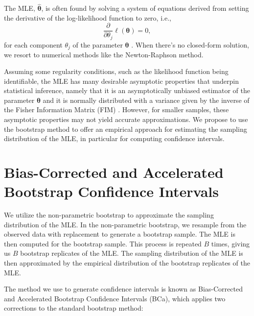 \documentclass[
]{article}
\begin{document}
The MLE, \(\hat{\boldsymbol{\theta}}\), is often found by solving a
system of equations derived from setting the derivative of the
log-likelihood function to zero, i.e., \begin{equation}
\label{eq:mle_eq}
\frac{\partial}{\partial \theta_j} \ell(\boldsymbol{\theta}) = 0,
\end{equation} for each component \(\theta_j\) of the parameter
\(\boldsymbol{\theta}\) \citep{bain}. When there's no closed-form
solution, we resort to numerical methods like the Newton-Raphson method.

Assuming some regularity conditions, such as the likelihood function
being identifiable, the MLE has many desirable asymptotic properties
that underpin statistical inference, namely that it is an asymptotically
unbiased estimator of the parameter \(\boldsymbol{\theta}\) and it is
normally distributed with a variance given by the inverse of the Fisher
Information Matrix (FIM) \citep{casella2002statistical}. However, for
smaller samples, these asymptotic properties may not yield accurate
approximations. We propose to use the bootstrap method to offer an
empirical approach for estimating the sampling distribution of the MLE,
in particular for computing confidence intervals.

\hypertarget{sec:boot}{%
\section{Bias-Corrected and Accelerated Bootstrap Confidence
Intervals}\label{sec:boot}}

We utilize the non-parametric bootstrap to approximate the sampling
distribution of the MLE. In the non-parametric bootstrap, we resample
from the observed data with replacement to generate a bootstrap sample.
The MLE is then computed for the bootstrap sample. This process is
repeated \(B\) times, giving us \(B\) bootstrap replicates of the MLE.
The sampling distribution of the MLE is then approximated by the
empirical distribution of the bootstrap replicates of the MLE.

The method we use to generate confidence intervals is known as
Bias-Corrected and Accelerated Bootstrap Confidence Intervals (BCa),
which applies two corrections to the standard bootstrap method:
\end{document}
